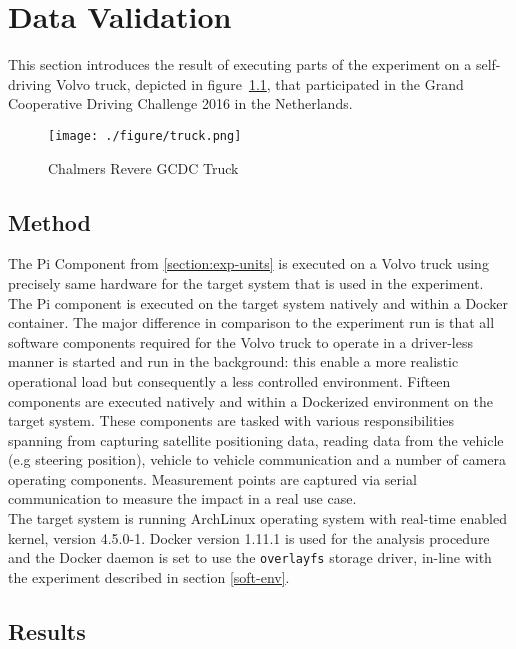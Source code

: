 \iffalse  \fi
\chapter{Data Validation}\label{section:data-validation}

This section introduces the result of executing parts of the experiment on a self-driving Volvo truck, depicted in figure~\ref{truck}, that participated in the Grand Cooperative Driving Challenge 2016 in the Netherlands. \\

\begin{figure}[ht]
\centering
     \texttt{[image: ./figure/truck.png]}
      \caption{Chalmers Revere GCDC Truck}
       \label{truck}
\end{figure}


\section{Method}
The Pi Component from \ref{section:exp-units} is executed on a Volvo truck using precisely same hardware for the target system that is used in the experiment. The Pi component is executed on the target system natively and within a Docker container. The major difference in comparison to the experiment run is that all software components required for the Volvo truck to operate in a driver-less manner is started and run in the background: this enable a more realistic operational load but consequently a less controlled environment. Fifteen components are executed natively and within a Dockerized environment on the target system. These components are tasked with various responsibilities spanning from capturing satellite positioning data, reading data from the vehicle (e.g steering position), vehicle to vehicle communication and a number of camera operating components. Measurement points are captured via serial communication to measure the impact in a real use case. \\

The target system is running ArchLinux operating system with real-time enabled kernel, version 4.5.0-1. Docker version 1.11.1 is used for the analysis procedure and the Docker daemon is set to use the \texttt{overlayfs} storage driver, in-line with the experiment described in section \ref{soft-env}.

\section{Results}




